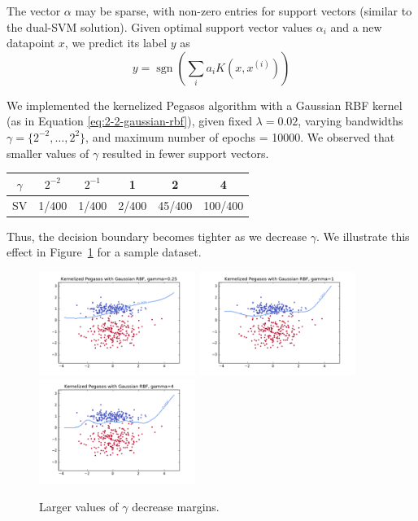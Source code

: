 \documentclass{article}
\DeclareMathOperator{\sgn}{sgn}
\begin{document}
\begin{multicols}{2}
The vector $\alpha$ may be sparse, with non-zero entries for support vectors (similar to the dual-SVM solution). Given optimal support vector values $\alpha_i$ and a new datapoint $x$, we predict its label $y$ as
\begin{equation}
    y = \sgn\left(\sum_i{a_i K(x,x^{(i)})}\right)
\end{equation}

We implemented the kernelized Pegasos algorithm with a Gaussian RBF kernel
(as in Equation \ref{eq:2-2-gaussian-rbf}), given fixed $\lambda = 0.02$, varying bandwidths $\gamma = \{2^{-2},\dots,2^2\}$, and maximum number of epochs = 10000.
We observed that smaller values of $\gamma$ resulted in fewer support vectors.

\begin{center}
\begin{tabular}{|c||c|c|c|c|c|}
\hline
$\gamma$ & $2^{-2}$ & $2^{-1}$ & 1 & 2 & 4\\ \hline
SV & 1/400 & 1/400 & 2/400 & 45/400 & 100/400 \\ \hline
\end{tabular}
\end{center}
Thus, the decision boundary becomes tighter as we decrease $\gamma$. We illustrate this effect in Figure~\ref{fig:3-3-gamma} for a sample dataset.

\begin{figure}[t]
   \centering
	\includegraphics[width=2in]{img/3-2-margins/3-3-kernel-025.pdf}
	\includegraphics[width=2in]{img/3-2-margins/3-3-kernel-1.pdf}
	\includegraphics[width=2in]{img/3-2-margins/3-3-kernel-4.pdf}
   \caption{Larger values of $\gamma$ decrease margins.}
   \label{fig:3-3-gamma}
\end{figure}


\end{multicols}
\end{document}
